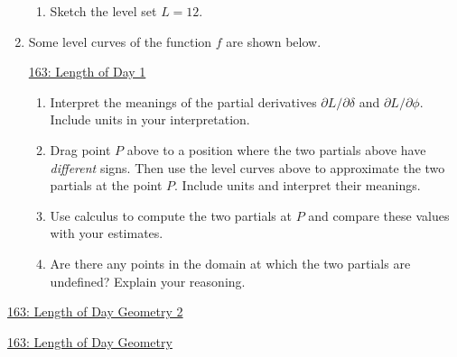 \documentclass{ximera}
\begin{document}
\begin{example}
\begin{enumerate}
\begin{enumerate}
\item Sketch the level set $L=12$.  
\end{enumerate}


\item Some level curves of the function $f$ are shown below.

\begin{onlineOnly}
    \begin{center}
\end{center}
\end{onlineOnly}

\href{https://www.desmos.com/calculator/ub47uf52hj}{163: Length of Day 1}

\begin{enumerate}
\item Interpret the meanings of the partial derivatives $\partial L/\partial \delta$ and $\partial L / \partial \phi$. Include units in your interpretation.

\item Drag point $P$ above to a position where the two partials above have \emph{different} signs. Then use the level curves above to approximate the two partials at the point $P$. Include units and interpret their meanings.

\item Use calculus to compute the two partials at $P$ and compare these values with your estimates.

\item Are there any points in the domain at which the two partials are undefined? Explain your reasoning.
\end{enumerate}


\end{enumerate}
\end{example}




\begin{example}  \label{E345432565554}

\begin{onlineOnly}
    \begin{center}
\end{center}
\end{onlineOnly}

\href{https://www.desmos.com/3d/wiygzeihnp}{163: Length of Day Geometry 2}



\begin{onlineOnly}
    \begin{center}
\end{center}
\end{onlineOnly}

\href{https://www.desmos.com/3d/jhuok4umw3}{163: Length of Day Geometry}

\end{example}
\end{document}
